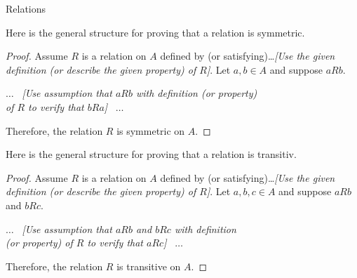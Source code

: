 \begin{section}{Relations}
\begin{skeleton}
Here is the general structure for proving that a relation is symmetric.

\begin{mdframed}[style=skeleton]
\begin{proof}
Assume $R$ is a relation on $A$ defined by (or satisfying)\ldots \emph{[Use the given definition (or describe the given property) of $R$]}.  Let $a, b\in A$ and suppose $aR b$.
\begin{center}
$\ldots$ \ \emph{[Use assumption that $aR b$ with definition (or property)\\ of $R$ to verify that $bR a$]} \ $\ldots$
\end{center}
\noindent Therefore, the relation $R$ is symmetric on $A$.
\end{proof}
\end{mdframed}
\end{skeleton}

\begin{skeleton}
Here is the general structure for proving that a relation is transitiv.

\begin{mdframed}[style=skeleton]
\begin{proof}
Assume $R$ is a relation on $A$ defined by (or satisfying)\ldots \emph{[Use the given definition (or describe the given property) of $R$]}.  Let $a, b, c\in A$ and suppose $aR b$ and $bR c$.
\begin{center}
$\ldots$ \ \emph{[Use assumption that $aR b$ and $bR c$ with definition\\ (or property) of $R$ to verify that $aR c$]} \ $\ldots$
\end{center}
\noindent Therefore, the relation $R$ is transitive on $A$.
\end{proof}
\end{mdframed}
\end{skeleton}


\end{section}
